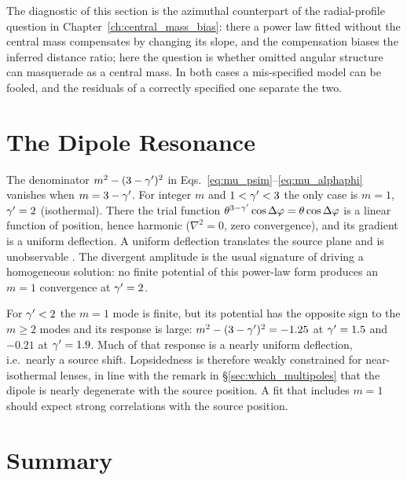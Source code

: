\begin{bridge}
The diagnostic of this section is the azimuthal counterpart of the
radial-profile question in Chapter~\ref{ch:central_mass_bias}: there a
power law fitted without the central mass compensates by changing its
slope, and the compensation biases the inferred distance ratio; here
the question is whether omitted angular structure can masquerade as a
central mass.  In both cases a mis-specified model can be fooled, and
the residuals of a correctly specified one separate the two.
\end{bridge}


\section{The Dipole Resonance}
\label{sec:mu_dipole}

The denominator $m^2-(3-\gamma')^2$ in
Eqs.~\eqref{eq:mu_psim}--\eqref{eq:mu_alphaphi} vanishes when
$m = 3-\gamma'$.  For integer $m$ and $1<\gamma'<3$ the only case is $m=1$,
$\gamma'=2$ (isothermal).  There the trial function
$\theta^{3-\gamma'}\cos\Delta\varphi = \theta\cos\Delta\varphi$ is a
linear function of position, hence harmonic ($\nabla^2=0$, zero
convergence), and its gradient is a uniform deflection.  A
uniform deflection translates the source plane and is
unobservable \citep[][\S4.1.3]{congdon_principles_2018}.  The divergent
amplitude is the usual signature of driving a homogeneous solution:
no finite potential of this power-law form produces an $m=1$
convergence at $\gamma'=2$.

\begin{remark}
For $\gamma'<2$ the $m=1$ mode is finite, but its potential has the
opposite sign to the $m\ge2$ modes and its response is large:
$m^2-(3-\gamma')^2 = -1.25$ at $\gamma'=1.5$ and $-0.21$ at $\gamma'=1.9$.  Much
of that response is a nearly uniform deflection, i.e.\ nearly a source
shift.  Lopsidedness is therefore weakly constrained for
near-isothermal lenses, in line with the remark in
\S\ref{sec:which_multipoles} that the dipole is nearly degenerate with
the source position.  A fit that includes $m=1$ should expect strong
correlations with the source position.
\end{remark}


\section{Summary}
\label{sec:mu_summary}

